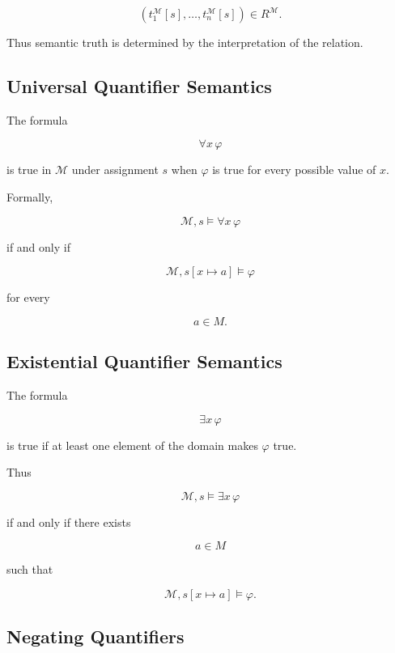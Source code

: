 \[
\boxed{
(
t_1^{\mathcal{M}}[s],
\ldots,
t_n^{\mathcal{M}}[s]
)
\in
R^{\mathcal{M}}.
}
\]

Thus semantic truth is determined by the interpretation of the relation.

\subsection{Universal Quantifier Semantics}
\label{subsec:universal-quantifier-semantics}

The formula

\[
\forall x\,\varphi
\]

is true in \(\mathcal{M}\) under assignment \(s\) when \(\varphi\) is true
for every possible value of \(x\).

Formally,

\[
\boxed{
\mathcal{M},s
\models
\forall x\,\varphi
}
\]

if and only if

\[
\boxed{
\mathcal{M},s[x\mapsto a]
\models
\varphi
}
\]

for every

\[
a\in M.
\]

\subsection{Existential Quantifier Semantics}
\label{subsec:existential-quantifier-semantics}

The formula

\[
\exists x\,\varphi
\]

is true if at least one element of the domain makes \(\varphi\) true.

Thus

\[
\boxed{
\mathcal{M},s
\models
\exists x\,\varphi
}
\]

if and only if there exists

\[
a\in M
\]

such that

\[
\boxed{
\mathcal{M},s[x\mapsto a]
\models
\varphi.
}
\]

\subsection{Negating Quantifiers}
\label{subsec:formal-negating-quantifiers}


